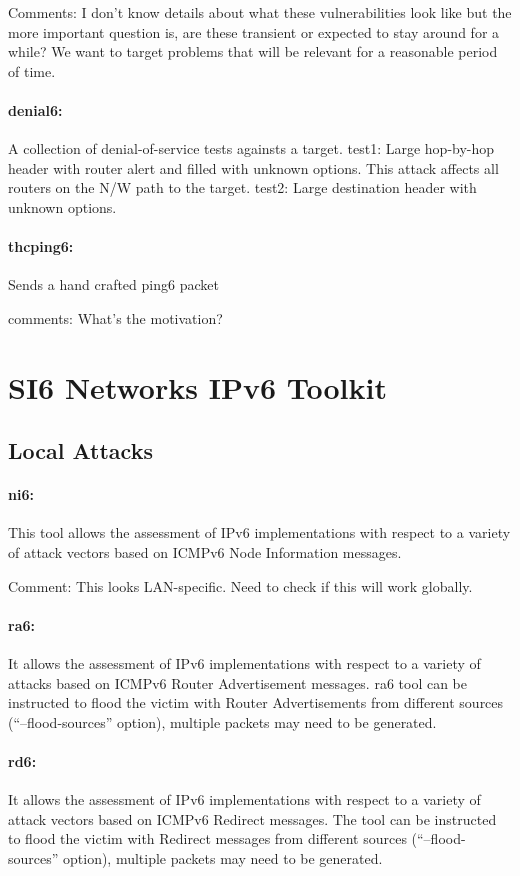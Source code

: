 \documentclass{article}
\begin{document}
Comments: I don't know details about what these vulnerabilities look like but the more important question is, are these transient or expected to stay around for a while? We want to target problems that will be relevant for a reasonable period of time.

\paragraph*{denial6:} A collection of denial-of-service tests againsts a target. test1: Large hop-by-hop header with router alert and filled with unknown options. This attack affects all routers on the N/W path to the target. test2: Large destination header with unknown options.

\paragraph*{thcping6:} Sends a hand crafted ping6 packet

comments: What's the motivation?



\section{SI6 Networks IPv6 Toolkit}
\label{fgont}	

\subsection{Local Attacks}
\paragraph*{ni6:} This tool allows the assessment of IPv6 implementations with respect to a variety of attack vectors based on ICMPv6 Node Information messages.

Comment: This looks LAN-specific. Need to check if this will work globally. 

\paragraph*{ra6:} It allows the assessment of IPv6 implementations with respect to a variety of attacks based on ICMPv6 Router Advertisement messages. ra6 tool can be instructed to flood the victim with Router Advertisements from different sources (“--flood-sources” option), multiple
packets may need to be generated.

\paragraph*{rd6:} It allows the assessment of IPv6 implementations with respect to a variety of attack vectors based on ICMPv6 Redirect messages. The tool can be instructed to flood the victim with Redirect messages from different sources (“--flood-sources” option), multiple packets may need to be generated.
\end{document}
